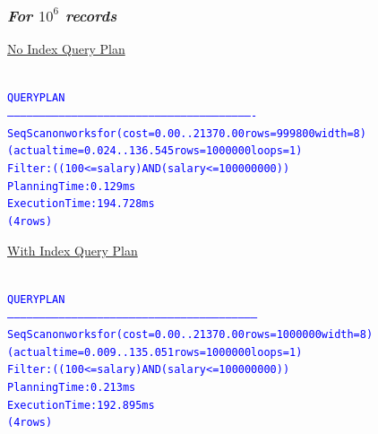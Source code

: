 \documentclass{article}
\begin{document}
    \subsubsection*{\emph{For $10^6$ records}}
    \underline{No Index Query Plan}
    \begin{center}
      {\tiny
      \begin{alltt}
      \textcolor{blue}{
        QUERY PLAN                                                     
        -------------------------------------------------------------------------------------------------------------------
         Seq Scan on worksfor  (cost=0.00..21370.00 rows=999800 width=8) (actual time=0.024..136.545 rows=1000000 loops=1)
           Filter: ((100 <= salary) AND (salary <= 100000000))
         Planning Time: 0.129 ms
         Execution Time: 194.728 ms
        (4 rows)
       }
      \end{alltt}
      }
    \end{center}
    \underline{With Index Query Plan}
    \begin{center}
      {\tiny
      \begin{alltt}
      \textcolor{blue}{
        QUERY PLAN                                                     
        --------------------------------------------------------------------------------------------------------------------
         Seq Scan on worksfor  (cost=0.00..21370.00 rows=1000000 width=8) (actual time=0.009..135.051 rows=1000000 loops=1)
           Filter: ((100 <= salary) AND (salary <= 100000000))
         Planning Time: 0.213 ms
         Execution Time: 192.895 ms
        (4 rows)
       }
      \end{alltt}
      }
    \end{center}
\end{document}

